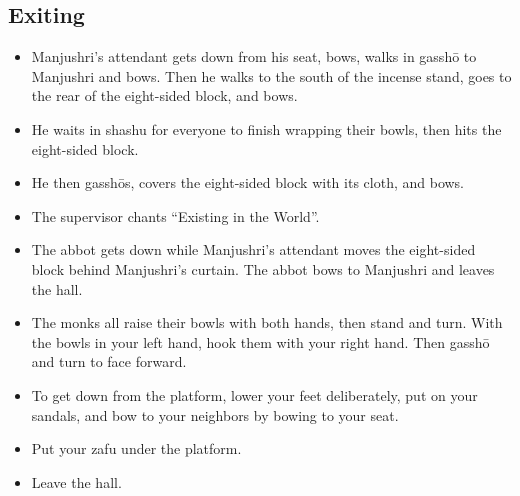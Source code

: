 \documentclass{article}
\begin{document}
\begin{multicols}{2}
\subsection{Exiting}

\begin{itemize}
\item Manjushri's attendant gets down from his seat, bows, walks in gassh\=o to
  Manjushri and bows. Then he walks to the south of the incense stand,
  goes to the rear of the eight-sided block, and bows.
\item He waits in shashu for everyone to finish wrapping their bowls,
  then hits the eight-sided block.
\item He then gassh\=os, covers the eight-sided block with its cloth, and
  bows.
\item The supervisor chants ``Existing in the World''.
\item The abbot gets down while Manjushri's attendant moves the eight-sided
  block behind Manjushri's curtain. The abbot bows to Manjushri and
  leaves the hall.
\item The monks all raise their bowls with both hands, then stand and
  turn. With the bowls in your left hand, hook them with your right hand.
  Then gassh\=o and turn to face forward.
\item To get down from the platform, lower your feet deliberately,
  put on your sandals, and bow to your neighbors by bowing to your seat.
\item Put your zafu under the platform.
\item Leave the hall.
\end{itemize}

\end{multicols}

\clearpage
\end{document}
